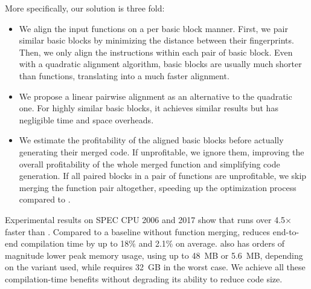 More specifically, our solution is three fold:
\begin{itemize} %
   \item We align the input functions on a per basic block manner.
   First, we pair similar basic blocks by minimizing the distance between their fingerprints.
   Then, we only align the instructions within each pair of basic block.  
   Even with a quadratic alignment algorithm, basic blocks are usually much shorter than functions, translating into a much faster alignment.
   \item We propose a linear pairwise alignment as an alternative to the quadratic one. For highly similar basic blocks, it achieves similar results but has negligible time and space overheads.
   \item We estimate the profitability of the aligned basic blocks before actually generating their merged code.
   If unprofitable, we ignore them, improving the overall profitability of the whole merged function and simplifying code generation.
   If all paired blocks in a pair of functions are unprofitable, we skip merging the function pair altogether, speeding up the optimization process compared to {\SOAName}. 
\end{itemize}

Experimental results on SPEC CPU 2006 and 2017 show that {\ProjName} runs over 4.5$\times$ faster than {\SOAName}.
Compared to a baseline without function merging, {\ProjName} reduces end-to-end compilation time by up to 18\% and 2.1\% on average.
{\ProjName} also has orders of magnitude lower peak memory usage, using up to 48~MB or 5.6~MB, depending on the variant used, while {\SOAName} requires 32~GB in the worst case.
We achieve all these compilation-time benefits without degrading its ability to reduce code size.







